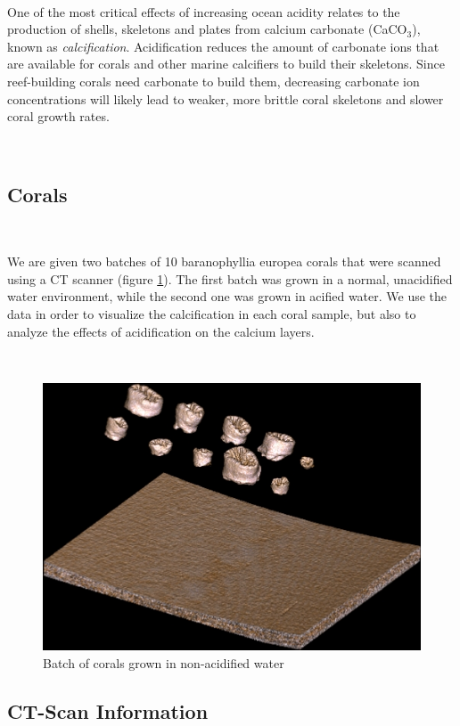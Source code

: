 \documentclass[12pt]{article}
\begin{document}
\

One of the most critical effects of increasing ocean acidity relates to the production of shells, skeletons and plates from calcium carbonate (CaCO$_3$), known as \emph{calcification}. Acidification reduces the amount of carbonate ions that are available for corals and other marine calcifiers to build their skeletons. Since reef-building corals need carbonate to build them, decreasing carbonate ion concentrations will likely lead to weaker, more brittle coral skeletons and slower coral growth rates.

\

\subsection{Corals}

\

We are given two batches of 10 baranophyllia europea corals that were scanned using a CT scanner (figure \ref{fig:1}). The first batch was grown in a normal, unacidified water environment, while the second one was grown in acified water. We use the data in order to visualize the calcification in each coral sample, but also to analyze the effects of acidification on the calcium layers.

\

\begin{figure}[!h]
\centering
\includegraphics[scale=0.4]{Batches.jpg}
\caption{Batch of corals grown in non-acidified water}
\label{fig:1}
\end{figure}

\subsection{CT-Scan Information}
\end{document}
